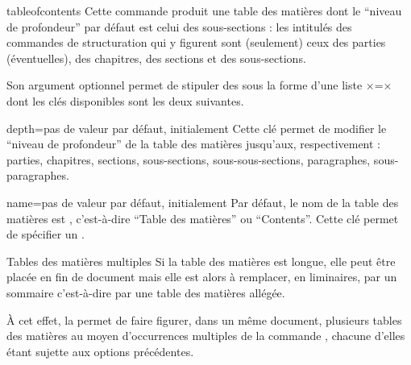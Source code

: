 \begin{docCommand}[doc description=\mandatory]{tableofcontents}{}
  Cette commande produit une table des matières dont le \enquote{niveau de
    profondeur} par défaut est celui des sous-sections : les intitulés des
  commandes de structuration qui y figurent sont (seulement) ceux des parties
  (éventuelles), des chapitres, des sections et des sous-sections.

  Son argument optionnel permet de stipuler des  sous la forme
  d'une liste ×=× dont les clés disponibles sont les
  deux suivantes.
  {%
    \begin{docKey}{depth}{=\textbar{}\textbar{}\textbar{}\textbar{}\textbar{}\textbar{}}{pas
        de valeur par défaut, initialement }
      Cette clé permet de modifier le \enquote{niveau de profondeur} de la
      table des matières jusqu'aux, respectivement : parties, chapitres,
      sections, sous-sections, sous-sous-sections, paragraphes,
      sous-paragraphes.
  \end{docKey}
  }
%
  \begin{docKey}{name}{=}{pas de valeur par défaut,
      initialement }
    Par défaut, le nom de la table des matières est
    , c'est-à-dire \enquote{Table des matières} ou
    \foreignquote{english}{Contents}\selonlangue{}. Cette clé permet de
    spécifier un .
  \end{docKey}
\end{docCommand}

\begin{dbremark}{Tables des matières multiples}{}
  Si la table des matières est longue, elle peut être placée en fin de document
  mais elle est alors à remplacer, en \glspl{liminaire}, par un sommaire
  c'est-à-dire par une table des matières allégée.

  À cet effet, la \yatcl{} permet de faire figurer, dans un même document,
  plusieurs tables des matières au moyen d'occurrences multiples de la commande
  , chacune d'elles étant sujette aux options
  précédentes.
\end{dbremark}

